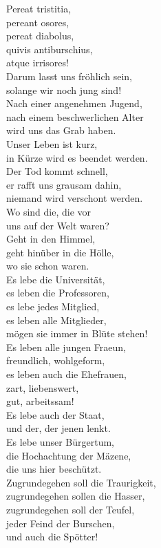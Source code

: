 \documentclass[a4paper]{article}
\begin{document}
\begin{multicols}{2}
	Pereat tristitia, \\
	pereant osores, \\
	pereat diabolus, \\
	quivis antiburschius, \\
	atque irrisores! \\


	Darum lasst uns fröhlich sein, \\
	solange wir noch jung sind! \\
	Nach einer angenehmen Jugend,  \\
	nach einem beschwerlichen Alter \\
	wird uns das Grab haben. \\

	Unser Leben ist kurz, \\
	in Kürze wird es beendet werden. \\
	Der Tod kommt schnell, \\
	er rafft uns grausam dahin, \\
	niemand wird verschont werden. \\

	Wo sind die, die vor \\
	uns auf der Welt waren? \\
	Geht in den Himmel, \\
	geht hinüber in die Hölle, \\
	wo sie schon waren. \\

	Es lebe die Universität, \\
	es leben die Professoren, \\
	es lebe jedes Mitglied, \\
	es leben alle Mitglieder, \\
	mögen sie immer in Blüte stehen!\\

	Es leben alle jungen Fraeun, \\
	freundlich, wohlgeform, \\
	es leben auch die Ehefrauen, \\
	zart, liebenswert, \\
	gut, arbeitssam! \\

	Es lebe auch der Staat, \\
	und der, der jenen lenkt. \\
	Es lebe unser Bürgertum, \\
	die Hochachtung der Mäzene, \\
	die uns hier beschützt. \\

	Zugrundegehen soll die Traurigkeit, \\
	zugrundegehen sollen die Hasser, \\
	zugrundegehen soll der Teufel, \\
	jeder Feind der Burschen, \\
	und auch die Spötter!
\end{multicols}
\end{document}
